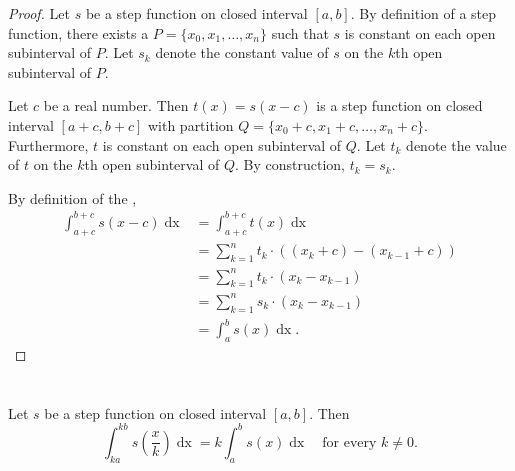 \documentclass{report}
\begin{document}
\begin{proof}

  Let $s$ be a step function on closed interval $[a, b]$.
  By definition of a step function, there exists a 
    $P = \{x_0, x_1, \ldots, x_n\}$ such that $s$ is constant on each open
    subinterval of $P$.
  Let $s_k$ denote the constant value of $s$ on the $k$th open subinterval of
    $P$.

  Let $c$ be a real number.
  Then $t(x) = s(x - c)$ is a step function on closed interval $[a + c, b + c]$
    with partition $Q = \{x_0 + c, x_1 + c, \ldots, x_n + c\}$.
  Furthermore, $t$ is constant on each open subinterval of $Q$.
  Let $t_k$ denote the value of $t$ on the $k$th open subinterval of $Q$.
  By construction, $t_k = s_k$.

  By definition of the ,
    \begin{align*}
      \int_{a+c}^{b+c} s(x - c) \mathop{dx}
        & = \int_{a+c}^{b+c} t(x) \mathop{dx} \\
        & = \sum_{k=1}^n t_k \cdot ((x_k + c) - (x_{k - 1} + c)) \\
        & = \sum_{k=1}^n t_k \cdot (x_k - x_{k - 1}) \\
        & = \sum_{k=1}^n s_k \cdot (x_k - x_{k - 1}) \\
        & = \int_a^b s(x) \mathop{dx}.
    \end{align*}

\end{proof}

\section{}%
\label{sec:step-expansion-contraction-interval-integration}
\label{sec:theorem-1.8}

\begin{theorem}[1.8]

  Let $s$ be a step function on closed interval $[a, b]$.
  Then
    $$\int_{ka}^{kb} s \left( \frac{x}{k} \right) \mathop{dx} =
      k \int_a^b s(x) \mathop{dx} \quad\text{for every } k \neq 0.$$

\end{theorem}
\end{document}

